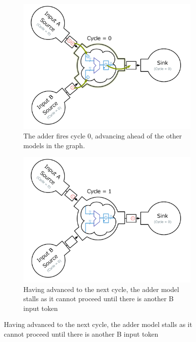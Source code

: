 \begin{figure}
    \begin{subfigure}[t]{0.45\textwidth}
	    \centering
        \includegraphics[width=\linewidth]{figures/adder-ex1.pdf}
        \caption{The adder fires cycle 0, advancing ahead of the other models
        in the graph.}
    \end{subfigure}
    \begin{subfigure}[t]{0.45\textwidth}
	    \centering
        \includegraphics[width=\linewidth]{figures/adder-ex2.pdf}
        \caption{Having advanced to the next cycle, the adder model stalls as
        it cannot proceed until there is another B input token}
    \end{subfigure}

\end{figure}
